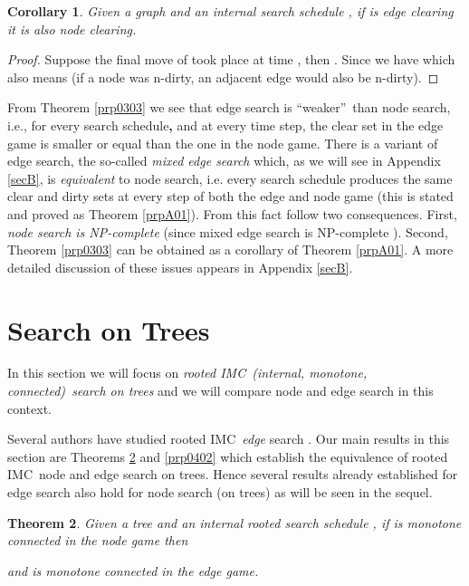 \documentclass[11pt]{article}\usepackage{amsmath}
\newtheorem{theorem}{Theorem}[section]
\newtheorem{corollary}[theorem]{Corollary}
\begin{document}
\begin{corollary}
\label{prp0304}Given a graph  and an internal search schedule
, if  is edge clearing it is also node clearing.
\end{corollary}

\begin{proof}
Suppose the final move of  took place at time , then
. Since  we have
 which also means  (if a node  was n-dirty, an
adjacent edge  would also be n-dirty).
\end{proof}

\begin{remark}
\label{prp0305}From Theorem \ref{prp0303} we see that edge search is
\textquotedblleft weaker\textquotedblright\ than node search, i.e., for every
search schedule\textbf{,} and at every time step, the clear set in the edge
game is smaller or equal than the one in the node game. There is a variant of
edge search, the so-called \emph{mixed edge search }which, as we will see in
Appendix \ref{secB}, is \emph{equivalent} to node search, i.e. every search
schedule produces the same clear and dirty sets at every step of both the edge
and node game (this is stated and proved as Theorem \ref{prpA01}). From this
fact follow two consequences. First, \emph{node search is NP-complete} (since
mixed edge search is NP-complete \cite{Bienstock}). Second, Theorem
\ref{prp0303} can be obtained as a corollary of Theorem \ref{prpA01}. A more
detailed discussion of these issues appears in Appendix \ref{secB}.
\end{remark}

\section{Search on Trees}

\label{sec04}

In this section we will focus on \emph{rooted IMC\ (internal, monotone,
connected)\ search on trees} and we will compare node and edge search in this context.

Several authors have studied rooted IMC\ \emph{edge} search \cite{Barriere1,
Barriere2, Fomin, Fraigniaud1, Fraigniaud2, Yang2}. Our main results in this
section are Theorems \ref{prp0401} and \ref{prp0402} which establish the
equivalence of rooted IMC\ node and edge search on trees. Hence several
results already established for edge search also hold for node search (on
trees) as will be seen in the sequel.

\begin{theorem}
\label{prp0401}Given a tree  and an internal \emph{rooted }search
schedule , if  is monotone connected \emph{in the node
game} then

and  is monotone connected in the edge game.
\end{theorem}
\end{document}
